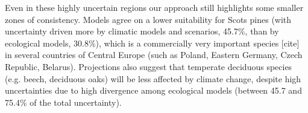 \documentclass[11pt,letter]{article}
\begin{document}
Even in these highly uncertain regions our approach still highlights some smaller zones of consistency. Models agree on a lower suitability for Scots pines (with uncertainty driven more by climatic models and scenarios, 45.7\%, than by ecological models, 30.8\%), which is a commercially very important species [cite] in several countries of Central Europe (such as Poland, Eastern Germany, Czech Republic, Belarus).
Projections also suggest that temperate deciduous species (e.g. beech, deciduous oaks) will be less affected by climate change, despite high uncertainties due to high divergence among ecological models (between 45.7 and 75.4\% of the total uncertainty). %



\end{document}
